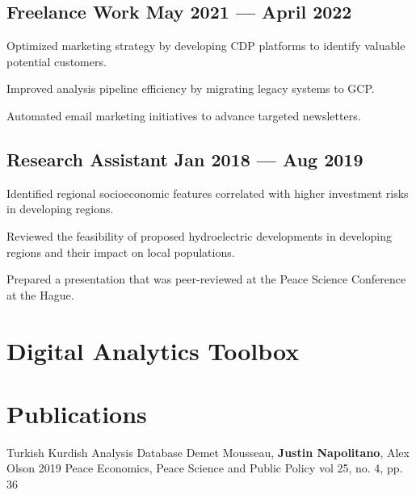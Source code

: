 \documentclass[doublesided, paper=a4, fontsize=10.5pt]{my-resume}
\begin{document}
{    \subsection{Freelance Work \hfill May 2021 --- April 2022}
    \begin{zitemize}
        \item Optimized marketing strategy by developing CDP platforms to identify valuable potential customers.
        \item Improved analysis pipeline efficiency by migrating legacy systems to GCP.
        \item Automated email marketing initiatives to advance targeted newsletters.
    \end{zitemize}

    \subsection{Research Assistant \hfill Jan 2018 --- Aug 2019}
    \begin{zitemize}
        \item Identified regional socioeconomic features correlated with higher investment risks in developing regions.
        \item Reviewed the feasibility of proposed hydroelectric developments in developing regions and their impact on local populations.
        \item Prepared a presentation that was peer-reviewed at the Peace Science Conference at the Hague.
    \end{zitemize}

    \section{Digital Analytics Toolbox}

    \section{Publications} 
    \pubdefaultspacing
    \justinpublication
    {Turkish Kurdish Analysis Database} 
    {Demet Mousseau, \textbf{Justin Napolitano}, Alex Olson} 
    {2019} 
    {Peace Economics, Peace Science and Public Policy vol 25, no. 4, pp. 36} 
    {}
}

\makebody
\end{document}
